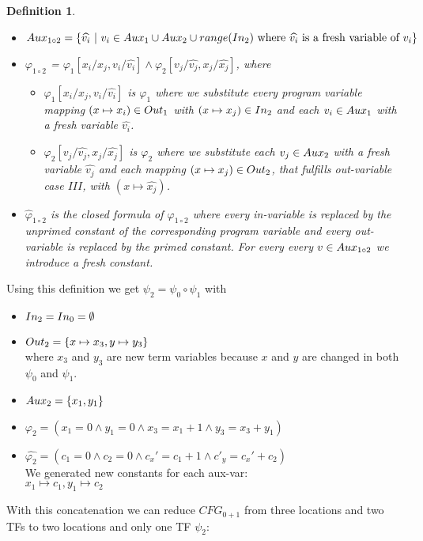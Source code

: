 \documentclass{article}
\newtheorem{mydef}{Definition}
\begin{document}
\begin{mydef}
\begin{itemize}
			\item $Aux_{1 \circ 2} = \{ \widehat{v_i} \ |\ v_i \in Aux_1 \cup Aux_2 \cup range(In_2) \text{ where } \widehat{v_i} \text{ is a fresh variable of } v_i \}$
			\item $\varphi_{1 \circ 2}$ = $\varphi_1[x_i / x_j, v_i / \widehat{v_i} ] \land \varphi_2[v_j / \widehat{v_j}, x_j / \widehat{x_j}]$, where
			 \begin{itemize}
				\item $\varphi_1[x_i / x_j, v_i / \widehat{v_i} ] $ is $\varphi_1$ where we substitute every program variable mapping $(x \mapsto x_i) \in Out_1$ with $(x \mapsto x_j) \in In_2$ and each $v_i \in Aux_1$ with a fresh variable $\widehat{v_i}$.
				\item  $\varphi_2[v_j / \widehat{v_j}, x_j / \widehat{x_j}]$ is $\varphi_2$ where we substitute each $v_j \in Aux_2$ with a fresh variable $\widehat{v_j}$ and each mapping $(x \mapsto x_j) \in Out_2$, that fulfills out-variable case $III$, with $(x \mapsto \widehat{x_j})$.
			\end{itemize} 
			
			\item $\widehat{\varphi}_{1 \circ 2}$ is the closed formula of $\varphi_{1 \circ 2}$ where every in-variable is replaced by the unprimed constant of the corresponding program variable and every out-variable is replaced by the primed constant. For every every $v \in Aux_{1 \circ 2}$ we introduce a fresh constant.
		\end{itemize}
	\end{mydef}

	\smallskip
	Using this definition we get $\psi_2 = \psi_0 \circ \psi_1$ with
	\begin{itemize}
		\item $In_2 = In_0 = \emptyset$
		\item $Out_2 = \{ x \mapsto x_3, y \mapsto y_3 \}$ \\ where $x_3$ and $y_3$ are new term variables because $x$ and $y$ are changed in both $\psi_0$ and $\psi_1$.
		\item $Aux_2 = \{x_1, y_1 \} $
		\item $\varphi_2 = (x_1 = 0 \land y_1 = 0 \land x_3 = x_1 + 1 \land y_3 = x_3 + y_1)$
		\item $\widehat{\varphi_2} = (c_1 = 0 \land c_2 = 0 \land c_x' = c_1 + 1 \land c'_y = c_x' + c_2)$ \\ We generated new constants for each aux-var: \\
		$x_1 \mapsto c_1, y_1 \mapsto c_2$
	\end{itemize}
	With this concatenation we can reduce $CFG_{0+1}$ from three locations and two TFs to two locations and only one TF $\psi_2$: \\
	
\end{document}
